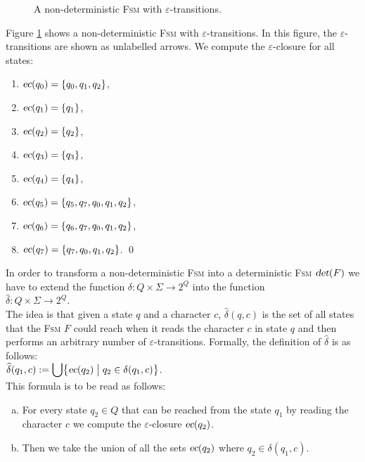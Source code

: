 \begin{figure}[!ht]
  \centering

   \caption{A non-deterministic \textsc{Fsm} with $\varepsilon$-transitions.}
  \label{fig:ab-or-ba-star.dot}
\end{figure}

\exampleEng
Figure \ref{fig:ab-or-ba-star.dot} shows a non-deterministic \textsc{Fsm} with 
$\varepsilon$-transitions.   In this figure, the $\varepsilon$-transitions are shown as unlabelled arrows.
We compute the $\varepsilon$-closure for all states:
\begin{enumerate}
\item $\textsl{ec}(q_0) = \{ q_0, q_1, q_2 \}$,
\item $\textsl{ec}(q_1) = \{ q_1 \}$,
\item $\textsl{ec}(q_2) = \{ q_2 \}$,
\item $\textsl{ec}(q_3) = \{ q_3 \}$,
\item $\textsl{ec}(q_4) = \{ q_4 \}$,
\item $\textsl{ec}(q_5) = \{ q_5, q_7, q_0, q_1, q_2 \}$,
\item $\textsl{ec}(q_6) = \{ q_6, q_7, q_0, q_1, q_2 \}$,
\item $\textsl{ec}(q_7) = \{ q_7, q_0, q_1, q_2 \}$.
      \qed
\end{enumerate}

\noindent
In order to transform a non-deterministic \textsc{Fsm} into a deterministic \textsc{Fsm}
$\textsl{det}(F)$ we have to extend the function $\delta:Q \times \Sigma \rightarrow 2^Q$ into the function
\\[0.2cm]
\hspace*{1.3cm}
$\widehat{\delta}: Q \times \Sigma \rightarrow 2^Q$.
\\[0.2cm]
The idea is that given a state $q$ and a character $c$,  $\widehat{\delta}(q,c)$ is the set of all states that the
\textsc{Fsm} $F$ could reach when it reads the character $c$ in state $q$ and then performs an arbitrary number
of $\varepsilon$-transitions.  Formally, the definition of $\widehat{\delta}$ is as follows:
\\[0.2cm]
\hspace*{1.3cm}
$\displaystyle \widehat{\delta}(q_1, c) := \bigcup \bigl\{ \textsl{ec}(q_2) \bigm| q_2 \in \delta(q_1, c) \bigr \}$.
\\[0.2cm]
This formula is to be read as follows:
\begin{enumerate}[(a)]
\item For every state $q_2 \in Q$ that can be reached from the state $q_1$ by reading the character $c$ we
      compute the $\varepsilon$-closure $\textsl{ec}(q_2)$.
\item Then we take the union of all the sets $\textsl{ec}(q_2)$ where $q_2 \in \delta(q_1, c)$.
\end{enumerate}

